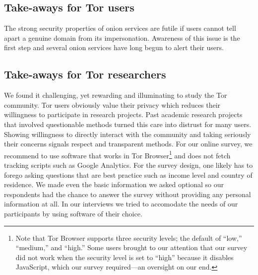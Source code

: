 \subsection{Take-aways for Tor users}

The strong security properties of onion services are futile if users cannot tell
apart a genuine domain from its impersonation.  Awareness of this issue is the
first step and several onion services have long begun to alert their users.





\subsection{Take-aways for Tor researchers}

We found it challenging, yet rewarding and illuminating to study the Tor
community.  Tor users obviously value their privacy which reduces their
willingness to participate in research projects.  Past academic research
projects that involved questionable methods turned this care into distrust for
many users.  Showing willingness to directly interact with the community and
taking seriously their concerns signals respect and transparent methods.  For
our online survey, we recommend to use software that works in Tor
Browser\footnote{Note that Tor Browser supports three security levels; the
default of ``low,'' ``medium,'' and ``high.''  Some users brought to our
attention that our survey did not work when the security level is set to
``high'' because it disables JavaScript, which our survey required---an
oversight on our end.} and does not fetch tracking scripts such as Google
Analytics.  For the survey design, one likely has to forego asking questions
that are best practice such as income level and country of residence.  We made
even the basic information we asked optional so our respondents had the chance
to answer the survey without providing any personal information at all.  In our
interviews we tried to accomodate the needs of our participants by using
software of their choice.
